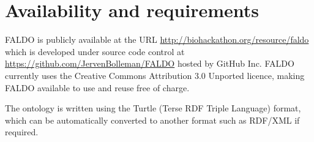 \section*{Availability and requirements}
FALDO is publicly available at the URL \url{http://biohackathon.org/resource/faldo}
which is developed under source code control at
\url{https://github.com/JervenBolleman/FALDO} hosted by GitHub Inc.
FALDO currently uses the Creative Commons Attribution 3.0 Unported licence,
making FALDO available to use and reuse free of charge.

The ontology is written using the Turtle (Terse RDF Triple Language) format,
which can be automatically converted to another format such as RDF/XML
if required.


